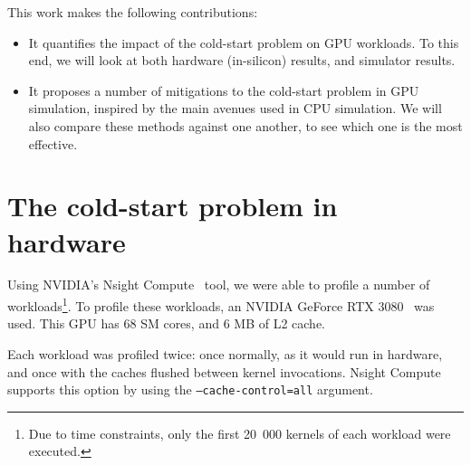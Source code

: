 \documentclass[5p,numvwe]{elsarticle}
\begin{document}
    This work makes the following contributions:
    \begin{itemize}
        \item It quantifies the impact of the cold-start problem on GPU workloads.
        To this end, we will look at both hardware (in-silicon) results, and simulator results.
        \item It proposes a number of mitigations to the cold-start problem in GPU simulation, inspired by the main avenues used in CPU simulation.
        We will also compare these methods against one another, to see which one is the most effective. %
    \end{itemize}

    \section{The cold-start problem in hardware}\label{sec:hw}
    Using NVIDIA's Nsight Compute~\cite{nsight} tool, we were able to profile a number of workloads\footnote{Due to time constraints, only the first 20\ 000 kernels of each workload were executed.}.
    To profile these workloads, an NVIDIA GeForce RTX 3080~\cite{nvidia-wp} was used.
    This GPU has 68 SM cores, and 6 MB of L2 cache.

    Each workload was profiled twice: once normally, as it would run in hardware, and once with the caches flushed between kernel invocations.
    Nsight Compute supports this option by using the \texttt{--cache-control=all} argument.
\end{document}
